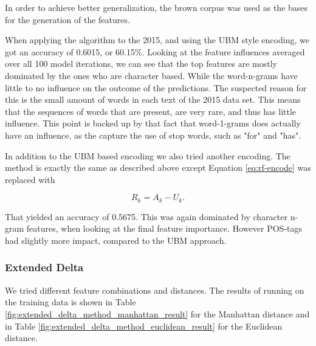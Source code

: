 In order to achieve better generalization, the brown corpus was used as the
bases for the generation of the features.

When applying the algorithm to the 2015, and using the \gls{UBM} style encoding,
we got an accuracy of 0.6015, or 60.15\%. Looking at the feature influences
averaged over all 100 model iterations, we can see that the top features are
mostly dominated by the ones who are character based. While the word-n-grams
have little to no influence on the outcome of the predictions. The suspected
reason for this is the small amount of words in each text of the 2015 data set.
This means that the sequences of words that are present, are very rare, and thus
has little influence. This point is backed up by that fact that word-1-grams
does actually have an influence, as the capture the use of stop words, such as
"for" and "has".

In addition to the \gls{UBM} based encoding we also tried another encoding. The
method is exactly the same as described above except Equation
\eqref{eq:rf-encode} was replaced with

\begin{equation}
    R_k = A_k - U_k.
\end{equation}

That yielded an accuracy of 0.5675. This was again dominated by character n-gram
features, when looking at the final feature importance. However \gls{POS}-tags
had slightly more impact, compared to the \gls{UBM} approach.

\subsubsection{Extended Delta} \label{subsubsec:method:extended_delta}
We tried different feature combinations and distances. The
results of running on the training data is shown in Table
\ref{fig:extended_delta_method_manhattan_result} for the Manhattan distance and
in Table \ref{fig:extended_delta_method_euclidean_result} for the Euclidean
distance.

